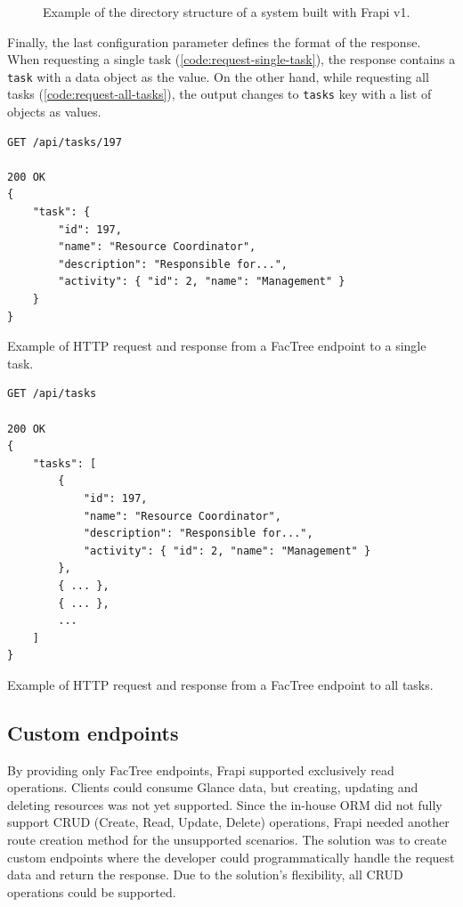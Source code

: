 \begin{figure}
\centering
\begin{minipage}{0.9\textwidth}
\end{minipage}
\caption{Example of the directory structure of a system built with Frapi v1.}
\label{fig:frapi-v1-factree-dir}
\end{figure}

Finally, the last configuration parameter defines the format of the response. When requesting a single task (\autoref{code:request-single-task}), the response contains a \texttt{task} with a data object as the value. On the other hand, while requesting all tasks (\autoref{code:request-all-tasks}), the output changes to \texttt{tasks} key with a list of objects as values.

\begin{listing}[htbp]
\begin{verbatim}
GET /api/tasks/197

200 OK
{
	"task": {
		"id": 197,
		"name": "Resource Coordinator",
		"description": "Responsible for...",
		"activity": { "id": 2, "name": "Management" }
	}
}
\end{verbatim}
\caption{Example of HTTP request and response from a FacTree endpoint to a single task.}
\label{code:request-single-task}
\end{listing}

\begin{listing}[htbp]
\begin{verbatim}
GET /api/tasks

200 OK
{
	"tasks": [
		{
			"id": 197,
			"name": "Resource Coordinator",
			"description": "Responsible for...",
			"activity": { "id": 2, "name": "Management" }
		},
		{ ... },
		{ ... },
		...
	]
}
\end{verbatim}
\caption{Example of HTTP request and response from a FacTree endpoint to all tasks.}
\label{code:request-all-tasks}
\end{listing}

\subsection{Custom endpoints}
\label{sec:custom-endpoints}

By providing only FacTree endpoints, Frapi supported exclusively read operations. Clients could consume Glance data, but creating, updating and deleting resources was not yet supported. Since the in-house ORM did not fully support CRUD (Create, Read, Update, Delete) operations, Frapi needed another route creation method for the unsupported scenarios. The solution was to create custom endpoints where the developer could programmatically handle the request data and return the response. Due to the solution's flexibility, all CRUD operations could be supported.

